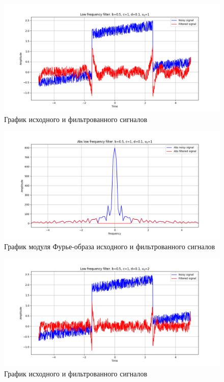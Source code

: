 \documentclass[a4paper, 12pt]{article}
\begin{document}
    \begin{figure}[!htb]
        \centering
        \includegraphics[scale=0.485]{10_u_flt_u_nolow.png}
        \captionsetup{skip=0pt}
        \caption{График исходного и фильтрованного сигналов}
        \label{fig:fig45}
    \end{figure}
    \begin{figure}[!htb]
        \centering
        \includegraphics[scale=0.485]{10_abs_u_U_nolow.png}
        \captionsetup{skip=0pt}
        \caption{График модуля Фурье-образа исходного и фильтрованного сигналов}
        \label{fig:fig46}
    \end{figure}
    \begin{figure}[!htb]
        \centering
        \includegraphics[scale=0.485]{11_u_flt_u_nolow.png}
        \captionsetup{skip=0pt}
        \caption{График исходного и фильтрованного сигналов}
        \label{fig:fig47}
    \end{figure}
\end{document}
